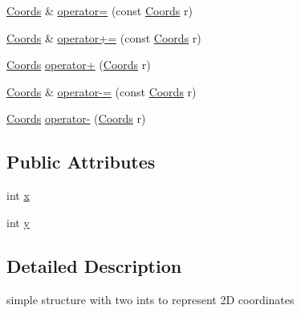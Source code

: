 \begin{DoxyCompactItemize}
\item 
\hyperlink{struct_coords}{\-Coords} \& \hyperlink{struct_coords_a25bcb0e2d2f5677a10b7652e90a6f97b}{operator=} (const \hyperlink{struct_coords}{\-Coords} r)
\item 
\hyperlink{struct_coords}{\-Coords} \& \hyperlink{struct_coords_a2549173108b2479b62fd79b82ec54e01}{operator+=} (const \hyperlink{struct_coords}{\-Coords} r)
\item 
\hyperlink{struct_coords}{\-Coords} \hyperlink{struct_coords_a168a9ed9edbffaf04e67c5b39306ca99}{operator+} (\hyperlink{struct_coords}{\-Coords} r)
\item 
\hyperlink{struct_coords}{\-Coords} \& \hyperlink{struct_coords_a9f61875c64b3726afd0bb0d465889bad}{operator-\/=} (const \hyperlink{struct_coords}{\-Coords} r)
\item 
\hyperlink{struct_coords}{\-Coords} \hyperlink{struct_coords_a7cc7a225781b6bbad3e00a5e9572fee1}{operator-\/} (\hyperlink{struct_coords}{\-Coords} r)
\end{DoxyCompactItemize}
\subsection*{\-Public \-Attributes}
\begin{DoxyCompactItemize}
\item 
int \hyperlink{struct_coords_a59992d986e76375f31828d32c05cd15d}{x}
\item 
int \hyperlink{struct_coords_a7ed64d02fb7550f1506a93fcfab7f16f}{y}
\end{DoxyCompactItemize}


\subsection{\-Detailed \-Description}
simple structure with two ints to represent 2\-D coordinates 

